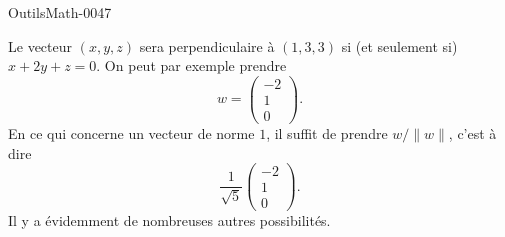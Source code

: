 
\begin{corrige}{OutilsMath-0047}

    Le vecteur $(x,y,z)$ sera perpendiculaire à $(1,3,3)$ si (et seulement si) $x+2y+z=0$. On peut par exemple prendre
    \begin{equation}
        w=\begin{pmatrix}
            -2    \\ 
            1    \\ 
            0    
        \end{pmatrix}.
    \end{equation}
    En ce qui concerne un vecteur de norme $1$, il suffit de prendre $w/\| w \|$, c'est à dire
    \begin{equation}
        \frac{1}{ \sqrt{5} }\begin{pmatrix}
            -2    \\ 
            1    \\ 
            0    
        \end{pmatrix}.
    \end{equation}
    Il y a évidemment de nombreuses autres possibilités.

\end{corrige}

